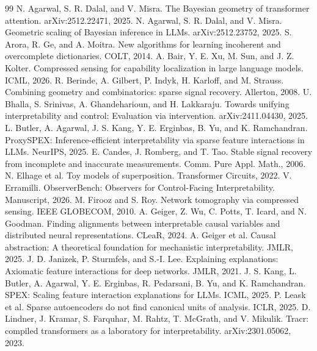 \documentclass[sigconf,10pt,nonacm,balance=false]{acmart}
\begin{document}
\begin{thebibliography}{99}
 N. Agarwal, S. R. Dalal, and V. Misra. The Bayesian geometry of transformer attention. arXiv:2512.22471, 2025.
 N. Agarwal, S. R. Dalal, and V. Misra. Geometric scaling of Bayesian inference in LLMs. arXiv:2512.23752, 2025.
 S. Arora, R. Ge, and A. Moitra. New algorithms for learning incoherent and overcomplete dictionaries. COLT, 2014.
 A. Bair, Y. E. Xu, M. Sun, and J. Z. Kolter. Compressed sensing for capability localization in large language models. ICML, 2026.
 R. Berinde, A. Gilbert, P. Indyk, H. Karloff, and M. Strauss. Combining geometry and combinatorics: sparse signal recovery. Allerton, 2008.
 U. Bhalla, S. Srinivas, A. Ghandeharioun, and H. Lakkaraju. Towards unifying interpretability and control: Evaluation via intervention. arXiv:2411.04430, 2025.
 L. Butler, A. Agarwal, J. S. Kang, Y. E. Erginbas, B. Yu, and K. Ramchandran. ProxySPEX: Inference-efficient interpretability via sparse feature interactions in LLMs. NeurIPS, 2025.
 E. Candes, J. Romberg, and T. Tao. Stable signal recovery from incomplete and inaccurate measurements. Comm. Pure Appl. Math., 2006.
 N. Elhage et al. Toy models of superposition. Transformer Circuits, 2022.
 V. Erramilli. ObserverBench: Observers for Control-Facing Interpretability. Manuscript, 2026.
 M. Firooz and S. Roy. Network tomography via compressed sensing. IEEE GLOBECOM, 2010.
 A. Geiger, Z. Wu, C. Potts, T. Icard, and N. Goodman. Finding alignments between interpretable causal variables and distributed neural representations. CLeaR, 2024.
 A. Geiger et al. Causal abstraction: A theoretical foundation for mechanistic interpretability. JMLR, 2025.
 J. D. Janizek, P. Sturmfels, and S.-I. Lee. Explaining explanations: Axiomatic feature interactions for deep networks. JMLR, 2021.
 J. S. Kang, L. Butler, A. Agarwal, Y. E. Erginbas, R. Pedarsani, B. Yu, and K. Ramchandran. SPEX: Scaling feature interaction explanations for LLMs. ICML, 2025.
 P. Leask et al. Sparse autoencoders do not find canonical units of analysis. ICLR, 2025.
 D. Lindner, J. Kramar, S. Farquhar, M. Rahtz, T. McGrath, and V. Mikulik. Tracr: compiled transformers as a laboratory for interpretability. arXiv:2301.05062, 2023.

\end{thebibliography}
\end{document}
